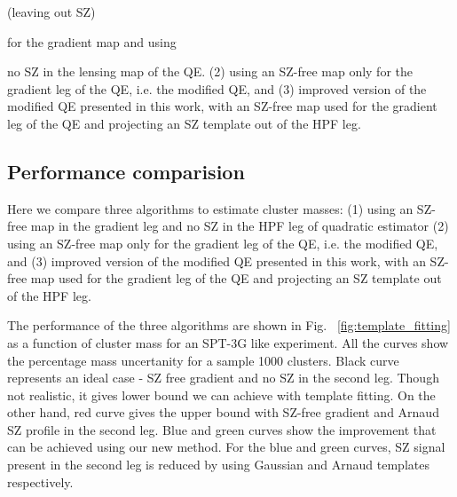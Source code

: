{(leaving out SZ)

for the gradient map and using 


no SZ in the lensing map of the QE. 
(2) using an SZ-free map only for the gradient leg of the QE, i.e. the modified QE, 
 and (3) improved version of the modified QE presented in this work, with an SZ-free map used for the gradient leg of the QE and projecting an SZ template out of the  HPF leg.
 
 \subsection{Performance comparision} 
Here we compare three algorithms to estimate cluster masses:  
(1) using an SZ-free map in the gradient leg and no SZ in the HPF leg of quadratic estimator
(2) using an SZ-free map only for the gradient leg of the QE, i.e. the modified QE, 
 and (3) improved version of the modified QE presented in this work, with an SZ-free map used for the gradient leg of the QE and projecting an SZ template out of the  HPF leg. 


The performance of the three algorithms are shown in Fig. ~\ref{fig:template_fitting} as a function of cluster mass for an SPT-3G like experiment.
 All the curves show the percentage mass uncertanity for a sample 1000 clusters. 
Black curve represents an ideal case - SZ free gradient and no SZ in the second leg.
Though not realistic, it gives lower bound we can achieve with template fitting. 
On the other hand, red curve gives the upper bound with SZ-free gradient and Arnaud SZ profile in the second leg.
Blue and green curves show the improvement that can be achieved using our new method. 
For the blue and green curves, SZ signal present in the second leg is reduced by using Gaussian and Arnaud templates respectively.


}
